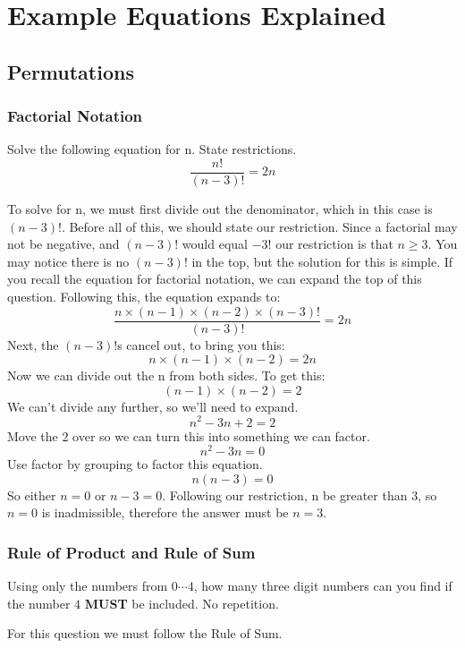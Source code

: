 \section{Example Equations Explained}

    \subsection{Permutations}
        \subsubsection{Factorial Notation}
            \begin{example}
            Solve the following equation for n. State restrictions.
            \[\frac{n!}{(n-3)!}=2n\]
            \end{example}
            To solve for n, we must first divide out the denominator, which in this case is $(n-3)!$. Before all of this, we should state our restriction. Since a factorial may not be negative, and $(n-3)!$ would equal $-3!$ our restriction is that \emph{$n\geqslant3$}. You may notice there is no $(n-3)!$ in the top, but the solution for this is simple. If you recall the equation for factorial notation, we can expand the top of this question.  Following this, the equation expands to:
            \[\frac{n\times(n-1)\times(n-2)\times(n-3)!}{(n-3)!}=2n\]
            Next, the $(n-3)!$s cancel out, to bring you this:
            \[n\times(n-1)\times(n-2) = 2n\]
            Now we can divide out the n from both sides. To get this:
            \[(n-1)\times(n-2) = 2\]
            We can't divide any further, so we'll need to expand.
            \[n^2 -3n+2 = 2\]
            Move the 2 over so we can turn this into something we can factor.
            \[n^2 -3n=0\]
            Use factor by grouping to factor this equation.
            \[n(n-3)=0\]
            So either $n=0$ or $n-3=0$. Following our restriction, n be greater than 3, so $n=0$ is inadmissible, therefore the answer must be $n=3$.
    \clearpage
        \subsubsection{Rule of Product and Rule of Sum}
            \begin{example}
            Using only the numbers from $0\cdots4$, how many three digit numbers can you find if the number $4$ \textbf{MUST} be included. No repetition.
            \end{example}
            For this question we must follow the Rule of Sum.
            
